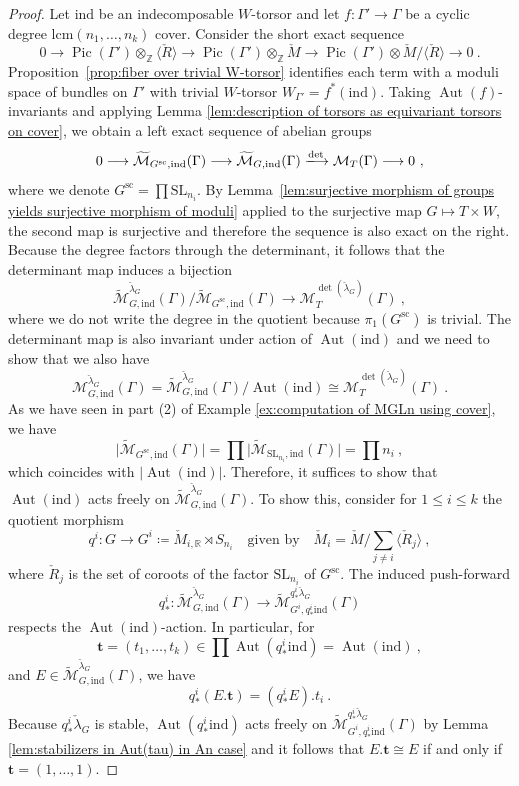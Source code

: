 \documentclass[10pt,a4paper]{amsart}
\DeclareMathOperator{\Aut}{Aut}
\newcommand{\Ga}{\Gamma}
\newcommand{\Mcheck}{{\check{M}}}
\DeclareMathOperator{\Pic}{Pic}
\newcommand{\R}{\mathbb{R}}
\newcommand{\Rcheck}{\check{R}}
\newcommand{\SL}{{\mathrm{SL}}}
\newcommand{\Z}{\mathbb{Z}}
\newcommand{\ind}{\mathrm{ind}}
\newcommand{\lambdacheck}{\check{\lambda}}
\newcommand{\mc}[1]{{\mathcal{#1}}}
\newcommand{\simc}{\mathrm{sc}}
\newcommand{\wmc}[1]{{\widetilde{\mathcal{#1}}}}
\begin{document}
\begin{proof}
Let $\ind$ be an indecomposable $W$-torsor and let $f\colon \Gamma'\to \Gamma$ be a cyclic degree $\mathrm{lcm}(n_1,\ldots, n_k)$ cover. Consider the short exact sequence
\[
    0 \longrightarrow 
        \Pic(\Gamma')\otimes_\Z \langle \Rcheck\rangle \longrightarrow
            \Pic(\Gamma')\otimes_\Z\Mcheck  
                \longrightarrow \Pic(\Gamma')\otimes \Mcheck/\langle\Rcheck\rangle \longrightarrow
                    0\ .
\]
Proposition~\ref{prop:fiber over trivial W-torsor} identifies each term with a moduli space of bundles on $\Ga'$ with trivial $W$-torsor $W_{\Ga'}=f^*(\ind)$. Taking $\Aut(f)$-invariants and applying Lemma \ref{lem:description of torsors as equivariant torsors on cover}, we obtain a left exact sequence of abelian groups
\[
0 \longrightarrow 
    \wmc M_{G^{\simc},\ind}(\Ga) \longrightarrow 
        \wmc M_{G,\ind}(\Ga) \xlongrightarrow{\det} 
            \mc M_{T}(\Ga) \longrightarrow
                0 \ ,
\]
where we denote $G^{\simc}=\prod \SL_{n_i}$. By Lemma~\ref{lem:surjective morphism of groups yields surjective morphism of moduli} applied to the surjective map $G\mapsto T\times W$, the second map is surjective and therefore the sequence is also exact on the right. Because the degree factors through the determinant, it follows that the determinant map induces a bijection
\[
    \wmc M^{\lambdacheck_G}_{G,\ind}(\Ga)/\wmc M_{G^{\simc},\ind}(\Ga) \longrightarrow 
        \mc M^{\det(\lambdacheck_G)}_{T}(\Ga) \ ,
\]
where we do not write the degree in the quotient because $\pi_1(G^{\simc})$ is trivial. The determinant map is also invariant under action of $\Aut(\ind)$ and we need to show that we also have
\[
    \mc M^{\lambdacheck_G}_{G,\ind}(\Ga)=\wmc M^{\lambdacheck_G}_{G,\ind}(\Ga)/\Aut(\ind)\cong 
        \mc M^{\det(\lambdacheck_G)}_{T}(\Ga) \ .
\]
As we have seen in part (2) of Example \ref{ex:computation of MGLn using cover}, we have 
\[
    \big|\wmc M_{G^{\simc},\ind}(\Gamma)\big|=\prod \big|\wmc M_{\SL_{n_i},\ind}(\Gamma)\big| =\prod n_i\ ,
\]
which coincides with $\big|\Aut(\ind)\big|$. Therefore, it suffices to show that $\Aut(\ind)$ acts freely on $\wmc M^{\lambdacheck_G}_{G,\ind}(\Ga)$. To show this, consider for $1\leq i\leq k$ the quotient morphism
\[
    q^i\colon G\to G^i\coloneqq \Mcheck_{i,\R} \rtimes S_{n_i}\quad\text{given by}\quad \Mcheck_i=\Mcheck /\sum_{j\neq i} \langle \Rcheck_j\rangle 
    \ ,
\]
where $\Rcheck_j$ is the set of coroots of the factor $\SL_{n_i}$ of $G^{\simc}$. The induced push-forward
\[
q^i_*\colon \wmc M^{\lambdacheck_G}_{G,\ind}(\Ga)\longrightarrow \wmc M^{q^i_*\lambdacheck_G}_{G^i,q^i_*\ind}(\Ga) 
\]
respects the $\Aut(\ind)$-action. In particular, for 
\[
    \mathbf t=(t_1,\ldots, t_k)\in \prod \Aut(q^i_*\ind)=\Aut(\ind) \ ,
\]
and $E\in \wmc M^{\lambdacheck_G}_{G,\ind}(\Ga)$, we have
\[
    q^i_*(E.\mathbf t)= (q^i_*E).t_i \ .
\]
Because $q^i_*\lambdacheck_G$ is stable, $\Aut(q^i_*\ind)$ acts freely on $\wmc M^{q^i_*\lambdacheck_G}_{G^i,q^i_*\ind}(\Ga)$ by Lemma \ref{lem:stabilizers in Aut(tau) in An case} and it follows that $E.\mathbf t\cong E$ if and only if $\mathbf t=(1,\ldots,1)$.
\end{proof}
\end{document}
